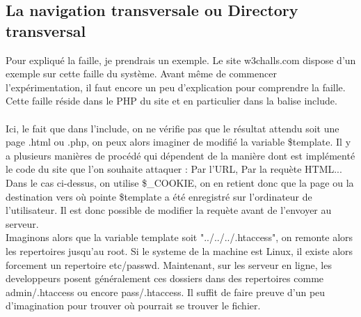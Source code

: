 \documentclass{article}
\begin{document}
\subsection{La navigation transversale ou Directory transversal}
\hspace*{0.6cm}Pour expliqu\'e la faille, je prendrais un exemple. Le site w3challs.com dispose d'un exemple sur cette faille du syst\`eme. Avant m\^eme de commencer l'exp\'erimentation, il faut encore un peu d'explication pour comprendre la faille. Cette faille r\'eside dans le PHP du site et en particulier dans la balise include.
\vspace{0.2cm}\\
\vspace{0.2cm}\\
\hspace*{0.6cm}Ici, le fait que dans l'include, on ne v\'erifie pas que le r\'esultat attendu soit une page .html ou .php, on peux alors imaginer de modifi\'e la variable \$template. Il y a plusieurs mani\`eres de proc\'ed\'e qui d\'ependent de la mani\`ere dont est impl\'ement\'e le code du site que l'on souhaite attaquer : Par l'URL, Par la requ\`ete HTML...\\
\hspace*{0.6cm}Dans le cas ci-dessus, on utilise \$\_COOKIE, on en retient donc que la page ou la destination vers o\`u pointe \$template a \'et\'e enregistr\'e sur l'ordinateur de l'utilisateur. Il est donc possible de modifier la requ\`ete avant de l'envoyer au serveur.
\vspace{0.2cm}\\
Imaginons alors que la variable template soit "../../../.htaccess", on remonte alors les repertoires jusqu'au root. Si le systeme de la machine est Linux, il existe alors forcement un repertoire etc/passwd. Maintenant, sur les serveur en ligne, les developpeurs posent g\'en\'eralement ces dossiers dans des repertoires comme admin/.htaccess ou encore pass/.htaccess. Il suffit de faire preuve d'un peu d'imagination pour trouver o\`u pourrait se trouver le fichier.
\end{document}
